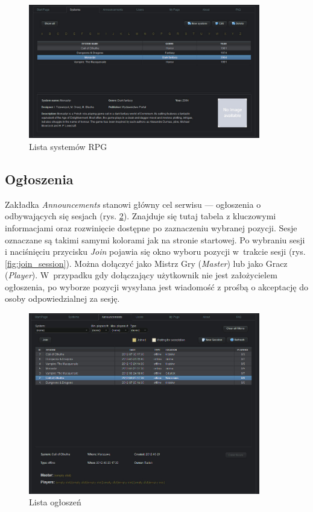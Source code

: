 \begin{figure}[htb]	
\centering
\includegraphics[width=0.9\textwidth]{./img/interfejsy/systems}
\caption{Lista systemów RPG}
\label{fig:systems}
\end{figure}

\subsection{Ogłoszenia}
\label{sec:sessions}
Zakładka \emph{Announcements} stanowi główny cel serwisu --- ogłoszenia o odbywających się sesjach (rys. \ref{fig:sessions}).  Znajduje się tutaj tabela z kluczowymi informacjami oraz rozwinięcie dostępne po zaznaczeniu wybranej pozycji. Sesje oznaczane są takimi samymi kolorami jak na stronie startowej. Po wybraniu sesji i naciśnięciu przycisku \emph{Join} pojawia się okno wyboru pozycji w~trakcie sesji (rys. \ref{fig:join_session}). Można dołączyć jako Mistrz Gry (\emph{Master}) lub jako Gracz (\emph{Player}). W~przypadku gdy dołączający użytkownik nie jest założycielem ogłoszenia, po wyborze pozycji wysyłana jest wiadomość z prośbą o akceptację do osoby odpowiedzialnej za sesję. 

\begin{figure}[htb]	
\centering
\includegraphics[width=0.9\textwidth]{./img/interfejsy/sessions}
\caption{Lista ogłoszeń}
\label{fig:sessions}
\end{figure}

